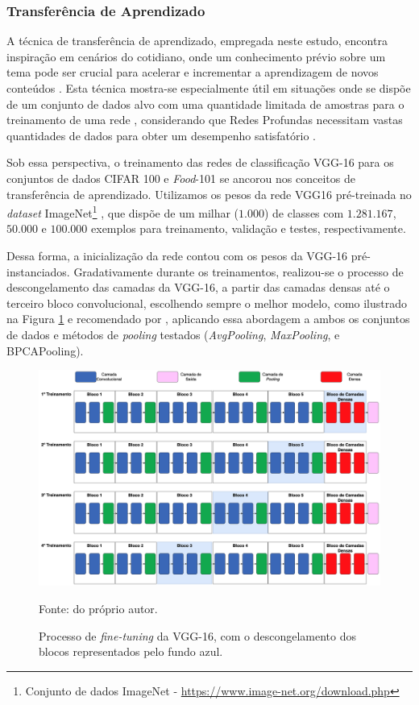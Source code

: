 \subsubsection{Transferência de Aprendizado}
\label{project:transf}
A técnica de transferência de aprendizado, empregada neste estudo, encontra inspiração em cenários do cotidiano, onde um conhecimento prévio sobre um tema pode ser crucial para acelerar e incrementar a aprendizagem de novos conteúdos \citep{Pan2010}. Esta técnica mostra-se especialmente útil em situações onde se dispõe de um conjunto de dados alvo com uma quantidade limitada de amostras para o treinamento de uma rede \citep{Weiss2016}, considerando que Redes Profundas necessitam vastas quantidades de dados para obter um desempenho satisfatório \citep{Goodfellow2016}.

Sob essa perspectiva, o treinamento das redes de classificação VGG-16 para os conjuntos de dados CIFAR 100 e \textit{Food}-101 se ancorou nos conceitos de transferência de aprendizado. Utilizamos os pesos da rede VGG16 pré-treinada no \textit{dataset} ImageNet\footnote{Conjunto de dados ImageNet - \url{https://www.image-net.org/download.php}} \citep{Deng2009ImageNet:Database}, que dispõe de um milhar ($1.000$) de classes com $1.281.167$, $50.000$ e $100.000$ exemplos para treinamento, validação e testes, respectivamente.

Dessa forma, a inicialização da rede contou com os pesos da VGG-16 pré-instanciados. Gradativamente durante os treinamentos, realizou-se o processo de descongelamento das camadas da VGG-16, a partir das camadas densas até o terceiro bloco convolucional, escolhendo sempre o melhor modelo, como ilustrado na Figura \ref{project:fig:transf1} e recomendado por \cite{Chollet2021DeepPython}, aplicando essa abordagem a ambos os conjuntos de dados e métodos de \textit{pooling} testados (\textit{AvgPooling}, \textit{MaxPooling}, e BPCAPooling).

\begin{figure}[H]
    \centering
    \caption{Processo de \textit{fine-tuning} da VGG-16, com o descongelamento dos blocos representados pelo fundo azul.}
    \includegraphics[width=1\textwidth]{recursos/imagens/project/fine-tunning.png}
    \label{project:fig:transf1}

    Fonte: do próprio autor.
\end{figure}

